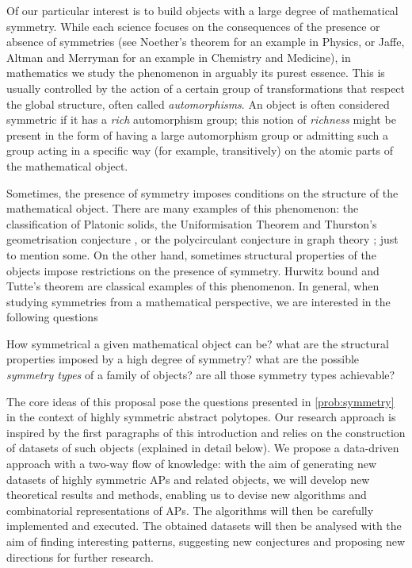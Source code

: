 Of our particular interest is to build objects with a large degree of mathematical symmetry.
While each science focuses on the consequences of the presence or absence of symmetries (see Noether's theorem \cite{Noether1918_InvarianteVariationsprobleme} for an example in Physics, or Jaffe, Altman and Merryman \cite*{JaffAltMer1964_AntipyridoxineEffectPenicillamine} for an example in Chemistry and Medicine), in mathematics we study the phenomenon in arguably its purest essence. 
This is usually controlled by the action of a certain group of transformations that respect the global structure, often called \emph{automorphisms}. 
An object is often considered symmetric if it has a \emph{rich} automorphism group; this notion of \emph{richness} might be present in the form of having a large automorphism group or admitting such a group acting in a specific way (for example, transitively) on the atomic parts of the mathematical object. 

Sometimes, the presence of symmetry imposes conditions on the structure of the mathematical object.
There are many examples of this phenomenon: the classification of Platonic solids, the Uniformisation Theorem \cite{Abikoff1981_UniformizationTheorem} and Thurston's geometrisation conjecture \cite{Thurston1982_ThreeDimensionalManifolds}, or the polycirculant conjecture in graph theory \cite{Marusic1981_VertexSymmetricDigraphs}; just to mention some.
On the other hand, sometimes structural properties of the objects impose restrictions on the presence of symmetry.
Hurwitz bound \cite{Hurwitz1892_UeberAlgebraischeGebilde} and Tutte's theorem \cite{Tutte1959_SymmetryCubicGraphs} are classical examples of this phenomenon.
In general, when studying symmetries from a mathematical perspective, we are interested in the following questions

\begin{problem}\label{prob:symmetry}
  How symmetrical a given mathematical object can be? what are the structural properties imposed by a high degree of symmetry? what are the possible \emph{symmetry types} of a family of objects? are all those symmetry types achievable?
\end{problem}

The core ideas of this proposal pose the questions presented in \cref{prob:symmetry} in the context of highly symmetric abstract polytopes. Our research approach is inspired by the first paragraphs of this introduction and relies on the construction of datasets of such objects (explained in detail below).
We propose a data-driven approach with a two-way flow of knowledge: with the aim of generating new datasets of highly symmetric APs and related objects, we will develop new theoretical results and methods, enabling us to devise new algorithms and combinatorial representations of APs. The algorithms will then be carefully implemented and executed.
The obtained datasets will then be analysed with the aim of finding interesting patterns, suggesting new conjectures and proposing new directions for further research.





